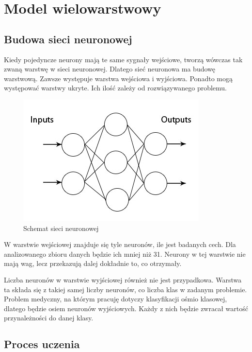     \section{Model wielowarstwowy}\label{sec:modelWielowarstwowy}

    \subsection{Budowa sieci neuronowej}\label{subsec:budowaSieciNeuronowej}

    Kiedy pojedyncze neurony mają te same sygnały wejściowe, tworzą wówczas tak zwaną warstwę w sieci neuronowej.
    Dlatego sieć neuronowa ma budowę warstwową.
    Zawsze występuje warstwa wejściowa i wyjściowa.
    Ponadto mogą występować warstwy ukryte.
    Ich ilość zależy od rozwiązywanego problemu.

    \begin{figure}[htp]
        \centering
        \includegraphics[scale=0.9]{./img/mlp.jpg}
        \caption{Schemat sieci neuronowej}
    \end{figure}

    W warstwie wejściowej znajduje się tyle neuronów, ile jest badanych cech.
    Dla analizowanego zbioru danych będzie ich mniej niż 31.
    Neurony w tej warstwie nie mają wag, lecz przekazują dalej dokładnie to, co otrzymały.

    Liczba neuronów w warstwie wyjściowej również nie jest przypadkowa.
    Warstwa ta składa się z takiej samej liczby neuronów, co liczba klas w zadanym problemie.
    Problem medyczny, na którym pracuję dotyczy klasyfikacji ośmio klasowej, dlatego będzie osiem neuronów wyjściowych.
    Każdy z nich będzie zwracał wartość przynależności do danej klasy.

    \subsection{Proces uczenia}\label{subsec:procesUczenia}

